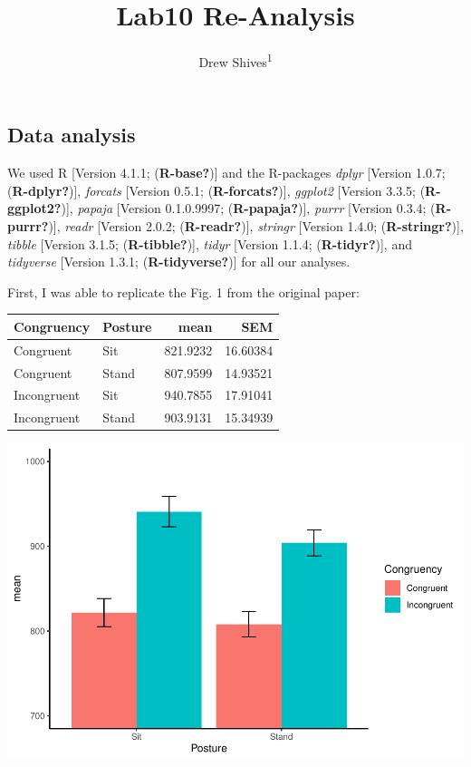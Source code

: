 \documentclass[
  english,
  man]{apa6}
\title{Lab10 Re-Analysis}
\author{Drew Shives\textsuperscript{1}}
\date{}
\affiliation{\vspace{0.5cm}\textsuperscript{1} The Graduate Center, CUNY}
\begin{document}
\maketitle

\pagestyle{headings}

\hypertarget{data-analysis}{%
\subsection{Data analysis}\label{data-analysis}}

We used R {[}Version 4.1.1; (\textbf{R-base?}){]} and the R-packages \emph{dplyr} {[}Version 1.0.7; (\textbf{R-dplyr?}){]}, \emph{forcats} {[}Version 0.5.1; (\textbf{R-forcats?}){]}, \emph{ggplot2} {[}Version 3.3.5; (\textbf{R-ggplot2?}){]}, \emph{papaja} {[}Version 0.1.0.9997; (\textbf{R-papaja?}){]}, \emph{purrr} {[}Version 0.3.4; (\textbf{R-purrr?}){]}, \emph{readr} {[}Version 2.0.2; (\textbf{R-readr?}){]}, \emph{stringr} {[}Version 1.4.0; (\textbf{R-stringr?}){]}, \emph{tibble} {[}Version 3.1.5; (\textbf{R-tibble?}){]}, \emph{tidyr} {[}Version 1.1.4; (\textbf{R-tidyr?}){]}, and \emph{tidyverse} {[}Version 1.3.1; (\textbf{R-tidyverse?}){]} for all our analyses.

\vspace{\baselineskip}

First, I was able to replicate the Fig. 1 from the original paper:

\vspace{\baselineskip}

\begin{tabular}{l|l|r|r}
\hline
Congruency & Posture & mean & SEM\\
\hline
Congruent & Sit & 821.9232 & 16.60384\\
\hline
Congruent & Stand & 807.9599 & 14.93521\\
\hline
Incongruent & Sit & 940.7855 & 17.91041\\
\hline
Incongruent & Stand & 903.9131 & 15.34939\\
\hline
\end{tabular}

\includegraphics{Lab10_files/figure-latex/unnamed-chunk-15-1.pdf}
\end{document}
